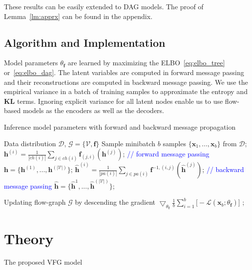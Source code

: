 \documentclass{article} %
\begin{document}
These results can be easily extended to DAG models. The proof of Lemma~\ref{lm:apprx} can be found in the appendix. 

\subsection{Algorithm and Implementation}
Model parameters $\theta_{\mathbf{f}}$ are learned by maximizing the ELBO~\eqref{eq:elbo_tree} or~\eqref{eq:elbo_dag}.  The latent variables are computed in forward message passing and their reconstructions are computed in backward message passing.  We use the empirical variance in a batch of training samples to approximate the entropy and \textbf{KL} terms. Ignoring  explicit variance  for all latent nodes enable us to use flow-based models as the encoders as well as the decoders. 

\begin{algorithm}[h!]
   \caption{Inference model parameters with  forward and backward message propagation}
   \label{alg:main}
\begin{algorithmic}
    Data distribution $\mathcal{D}$,  $\mathcal{G} = \{\mathcal{V}, \mathbf{f}\}$
   \REPEAT
   \STATE Sample minibatch $b$ samples $\{\mathbf{x}_1, ..., \mathbf{x}_b \}$ from $\mathcal{D}$;
   \STATE $\mathbf{h}^{(i)} = \frac{1}{|ch(i)|} \sum_{j \in ch(i) } \mathbf{f}_{(j,i)}(\mathbf{h}^{(j)})$;  \textcolor{blue}{// forward message passing}
   \ENDFOR
    \STATE  $\mathbf{h} =  \{\mathbf{h}^{(1)}, ...,  \mathbf{h}^{(|\mathcal{V}|)}  \}$;
   \STATE $\widehat{\mathbf{h}}^{(i)} = \frac{1}{|pa(i)|} \sum_{j \in pa(i) } \mathbf{f}^{-1, (i,j)}(\widehat{\mathbf{h}}^{(j)}) $;  \textcolor{blue}{// backward message passing}
   \ENDFOR
    \STATE  $ \widehat{\mathbf{h}} =  \{\widehat{\mathbf{h}}^{1}, ...,  \widehat{\mathbf{h}}^{(|\mathcal{V}|)}  \}$;
    
    \STATE Updating flow-graph $\mathcal{G}$ by descending the gradient $\bigtriangledown_{\theta_{\mathbf{f}}}\frac{1}{b} \sum_{i=1}^b  \big[ -\mathcal{L}(\mathbf{x}_b; \theta_{\mathbf{f}} ) \big] $ ;
\end{algorithmic}
\end{algorithm}




\section{Theory}
The proposed VFG model 
\end{document}
